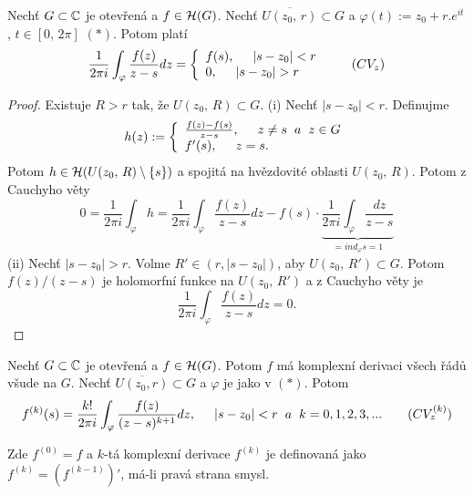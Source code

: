 
\begin{theorem}
Nechť $G\subset{\operatorname{\mathbb{C}}}$ je otevřená a $f\in\operatorname{\mathcal{H}} (G)$. Nechť $\overline{U(z_0,\, r)}\subset{G}$ a $\varphi{(t)}:=z_0+r.e^{it}$, $t\in{[0,\, 2\pi]}$ $(*)$. Potom platí 
\begin{equation}
    \frac{1}{2\pi{i}}\int_\varphi{\frac{f(z)}{z-s}dz}=
\left\{
	\begin{array}{ll}
		f(s), \hspace{5mm} |s-z_0|<r\\
		0,\hspace{5mm} |s-z_0|>r
	\end{array}
\right.
\tag{$CV_z$}
\label{eqn:cvz}
\end{equation}
\end{theorem}

\begin{proof}
Existuje $R>r$ tak, že $U(z_0,\, R)\subset{G}$.\newline
(i) Nechť $|s-z_0|<r$. Definujme 
\[h(z):=
\left\{
	\begin{array}{ll}
		\frac{f(z)-f(s)}{z-s},\hspace{5mm}z\neq{s}\hspace{2mm} a\hspace{2mm} z\in{G}\\
		f'(s),\hspace{5mm}z=s.
	\end{array}
\right.\]
Potom $h\in\operatorname{\mathcal{H}} (U(z_0,\, R)\setminus\{s\})$ a spojitá na hvězdovité oblasti $U(z_0,\, R)$. Potom z Cauchyho věty 
\[0=
\frac{1}{2\pi{i}}\int_\varphi{h}=
\frac{1}{2\pi{i}}\int_\varphi{\frac{f(z)}{z-s}}dz-f(s)\cdot \underbrace{\frac{1}{2\pi{i}}\int_\varphi{\frac{dz}{z-s}}}_{=ind_\varphi{s} = 1}
\]
(ii) Nechť $|s-z_0|>r$. Volme $R'\in(r,|s-z_0|)$, aby $U(z_0,\, R')\subset{G}$. Potom $f(z)/(z-s)$ je holomorfní funkce na $U(z_0,\, R')$ a z Cauchyho věty je 
\[\frac{1}{2\pi{i}}\int_\varphi{\frac{f(z)}{z-s}}dz =0.\]
\end{proof}

\begin{consequence}
Nechť $G\subset{\operatorname{\mathbb{C}}}$ je otevřená a $f\in\operatorname{\mathcal{H}} (G)$. Potom $f$ má komplexní derivaci všech řádů všude na $G$. Nechť $\overline{U(z_0,r)}\subset{G}$ a $\varphi$ je jako v $(*)$. Potom 
\begin{equation}
f^{(k)}(s)=
\frac{k!}{2\pi{i}}\int_\varphi{\frac{f(z)}{(z-s)^{k+1}}}dz,\hspace{5mm} |s-z_0|<r\hspace{2mm} a\hspace{2mm} k = 0,1,2,3,... 
\tag{$CV^{(k)}_z$}
\label{eqn:cvkz}
\end{equation}

Zde $f^{(0)}=f$ a $k$-tá komplexní derivace $f^{(k)}$ je definovaná jako $f^{(k)}=(f^{(k-1)})'$, má-li pravá strana smysl.
\end{consequence}


